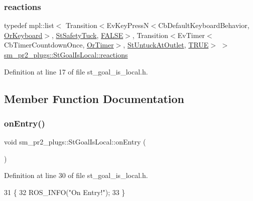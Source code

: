\subsubsection{\texorpdfstring{reactions}{reactions}}
{\footnotesize\ttfamily typedef mpl\+::list$<$ Transition$<$Ev\+Key\+PressN$<$Cb\+Default\+Keyboard\+Behavior, \hyperlink{classsm__pr2__plugs_1_1OrKeyboard}{Or\+Keyboard}$>$, \hyperlink{structsm__pr2__plugs_1_1StSafetyTuck}{St\+Safety\+Tuck}, \hyperlink{structsm__pr2__plugs_1_1StGoalIsLocal_1_1FALSE}{F\+A\+L\+SE}$>$, Transition$<$Ev\+Timer$<$Cb\+Timer\+Countdown\+Once, \hyperlink{classsm__pr2__plugs_1_1OrTimer}{Or\+Timer}$>$, \hyperlink{structsm__pr2__plugs_1_1StUntuckAtOutlet}{St\+Untuck\+At\+Outlet}, \hyperlink{structsm__pr2__plugs_1_1StGoalIsLocal_1_1TRUE}{T\+R\+UE}$>$ $>$ \hyperlink{structsm__pr2__plugs_1_1StGoalIsLocal_a5e2307f3b40c73716bdb763e1d92dce2}{sm\+\_\+pr2\+\_\+plugs\+::\+St\+Goal\+Is\+Local\+::reactions}}



Definition at line 17 of file st\+\_\+goal\+\_\+is\+\_\+local.\+h.



\subsection{Member Function Documentation}
\mbox{\label{structsm__pr2__plugs_1_1StGoalIsLocal_a24c721242f553176d7af47e2c41077e0}} 
\subsubsection{\texorpdfstring{on\+Entry()}{onEntry()}}
{\footnotesize\ttfamily void sm\+\_\+pr2\+\_\+plugs\+::\+St\+Goal\+Is\+Local\+::on\+Entry (\begin{DoxyParamCaption}{ }\end{DoxyParamCaption})\hspace{0.3cm}{\ttfamily [inline]}}



Definition at line 30 of file st\+\_\+goal\+\_\+is\+\_\+local.\+h.


\begin{DoxyCode}
31     \{
32         ROS\_INFO(\textcolor{stringliteral}{"On Entry!"});
33     \}
\end{DoxyCode}
\mbox{\label{structsm__pr2__plugs_1_1StGoalIsLocal_aeb178f881033ed86b26ab4543ba05bad}} 
